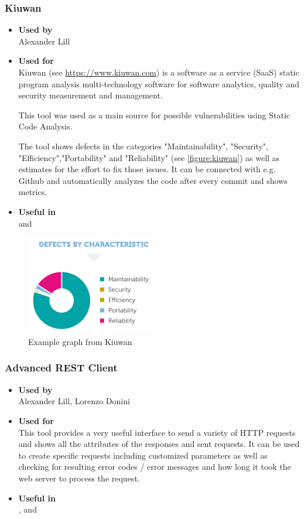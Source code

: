 \subsubsection*{Kiuwan}
\begin{itemize}
	\item \textbf{Used by}\\ Alexander Lill
	\item \textbf{Used for}\\
	Kiuwan (see \url{https://www.kiuwan.com}) is a software as a service (SaaS) static program analysis multi-technology software for software analytics, quality and security measurement and management.
	
	This tool was used as a main source for possible vulnerabilities using Static Code Analysis.
	
	The tool shows defects in the categories "Maintainability", "Security", "Efficiency","Portability" and "Reliability" (see \autoref{figure:kiuwan}) as well as estimates for the effort to fix those issues. It can be connected with e.g. Github and automatically analyzes the code after every commit and shows metrics.
	\item \textbf{Useful in}\\  and 
\end{itemize}

\begin{figure}[h!tbp]
	\centering
	\includegraphics[width=0.5\textwidth]{figures/kiuwanResults}
	\caption{Example graph from Kiuwan}
	\label{figure:kiuwan}
\end{figure}

\subsubsection*{Advanced REST Client}
\begin{itemize}
	\item \textbf{Used by}\\ Alexander Lill, Lorenzo Donini
	\item \textbf{Used for}\\
	This tool provides a very useful interface to send a variety of HTTP requests and shows all the attributes of the responses and sent requests. It can be used to create specific requests including customized parameters as well as checking for resulting error codes / error messages and how long it took the web server to process the request.
	\item \textbf{Useful in}\\ ,  and 
\end{itemize}

